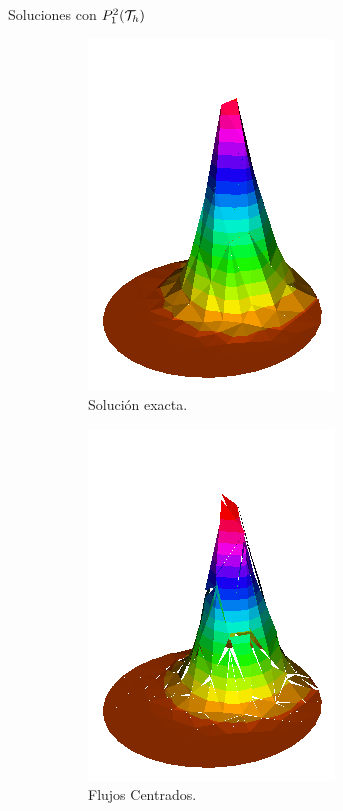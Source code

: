 		\begin{frame}{Soluciones con $\relax{P}_1^2(\mathcal{T}_h)$}
		\vspace{-0.2cm}
		\begin{figure}[h!]
			\begin{subfigure}[b]{0.27\textwidth}
				\centering
				\includegraphics[scale=0.22]{img/Conveccion_Reaccion/Recortes/steady_convect_react_exact_n_32.png}
				\caption{Solución exacta.}
			\end{subfigure}
			\begin{subfigure}[b]{0.27\textwidth}
				\centering
				\includegraphics[scale=0.22]{img/Conveccion_Reaccion/Recortes/steady_convect_react_approx_CF_n_32.png}
				\caption{Flujos Centrados.}
			\end{subfigure}
			\begin{subfigure}[b]{0.27\textwidth}

\end{subfigure}
\end{figure}
\end{frame}
